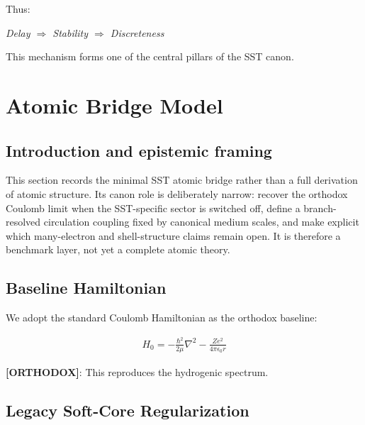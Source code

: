 \documentclass[11pt]{article}
\theoremstyle{definition}
\theoremstyle{plain}
\theoremstyle{remark}
\begin{document}
        Thus:
        
        \begin{center}
            \textit{Delay $\Rightarrow$ Stability $\Rightarrow$ Discreteness}
        \end{center}
        
        This mechanism forms one of the central pillars of the SST canon.

        
\section{Atomic Bridge Model}
    \label{sec:atomic}

    \subsection{Introduction and epistemic framing}
        This section records the minimal SST atomic bridge rather than a full derivation of atomic structure. Its canon role is deliberately narrow: recover the orthodox Coulomb limit when the SST-specific sector is switched off, define a branch-resolved circulation coupling fixed by canonical medium scales, and make explicit which many-electron and shell-structure claims remain open. It is therefore a benchmark layer, not yet a complete atomic theory.
    
    \subsection{Baseline Hamiltonian}
        
        We adopt the standard Coulomb Hamiltonian as the orthodox baseline:
        
        \begin{align}
            H_0 = -\frac{\hbar^2}{2\mu} \nabla^2 - \frac{Ze^2}{4\pi \epsilon_0 r}
            \label{eq:coulomb}
        \end{align}
        
        \textbf{[ORTHODOX]}: This reproduces the hydrogenic spectrum.

    \subsection{Legacy Soft-Core Regularization}
\end{document}
